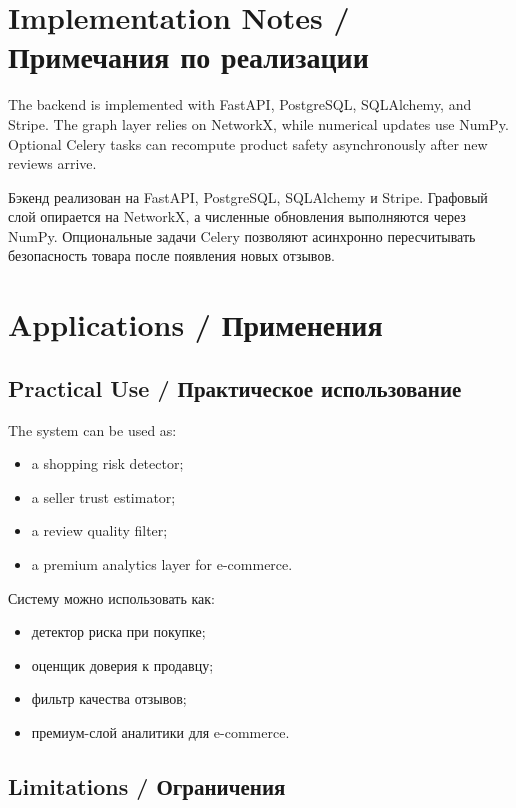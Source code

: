 \documentclass[12pt,a4paper]{article}
\begin{document}
\section{Implementation Notes / Примечания по реализации}

The backend is implemented with FastAPI, PostgreSQL, SQLAlchemy, and Stripe. The graph layer relies on NetworkX, while numerical updates use NumPy. Optional Celery tasks can recompute product safety asynchronously after new reviews arrive.

Бэкенд реализован на FastAPI, PostgreSQL, SQLAlchemy и Stripe. Графовый слой опирается на NetworkX, а численные обновления выполняются через NumPy. Опциональные задачи Celery позволяют асинхронно пересчитывать безопасность товара после появления новых отзывов.

\section{Applications / Применения}

\subsection{Practical Use / Практическое использование}

The system can be used as:
\begin{itemize}
    \item a shopping risk detector;
    \item a seller trust estimator;
    \item a review quality filter;
    \item a premium analytics layer for e-commerce.
\end{itemize}

Систему можно использовать как:
\begin{itemize}
    \item детектор риска при покупке;
    \item оценщик доверия к продавцу;
    \item фильтр качества отзывов;
    \item премиум-слой аналитики для e-commerce.
\end{itemize}

\subsection{Limitations / Ограничения}
\end{document}
